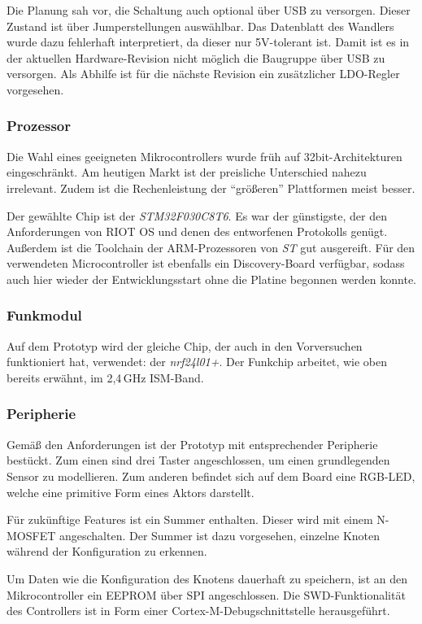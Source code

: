 \documentclass{IEEEtran}
\begin{document}
Die Planung sah vor, die Schaltung auch optional über USB zu versorgen.
Dieser Zustand ist über Jumperstellungen auswählbar.
Das Datenblatt des Wandlers wurde dazu fehlerhaft interpretiert, da dieser nur 5V-tolerant ist.
Damit ist es in der aktuellen Hardware-Revision nicht möglich die Baugruppe über USB zu versorgen.
Als Abhilfe ist für die nächste Revision ein zusätzlicher LDO-Regler vorgesehen.

\subsubsection{Prozessor}
Die Wahl eines geeigneten Mikrocontrollers wurde früh auf 32bit-Architekturen eingeschränkt.
Am heutigen Markt ist der preisliche Unterschied nahezu irrelevant.
Zudem ist die Rechenleistung der \enquote{größeren} Plattformen meist besser.

Der gewählte Chip ist der \emph{STM32F030C8T6}.
Es war der günstigste, der den Anforderungen von RIOT OS und denen des entworfenen Protokolls genügt.
Außerdem ist die Toolchain der ARM-Prozessoren von \emph{ST} gut ausgereift.
Für den verwendeten Microcontroller ist ebenfalls ein Discovery-Board verfügbar, sodass auch hier wieder der Entwicklungsstart ohne die Platine begonnen werden konnte.

\subsubsection{Funkmodul}
Auf dem Prototyp wird der gleiche Chip, der auch in den Vorversuchen funktioniert hat, verwendet: der \emph{nrf24l01+}. Der Funkchip arbeitet, wie oben bereits erwähnt, im 2,4\,GHz ISM-Band.


\subsubsection{Peripherie}
Gemäß den Anforderungen ist der Prototyp mit entsprechender Peripherie bestückt.
Zum einen sind drei Taster angeschlossen, um einen grundlegenden Sensor zu modellieren.
Zum anderen befindet sich auf dem Board eine RGB-LED, welche eine primitive Form eines Aktors darstellt.

Für zukünftige Features ist ein Summer enthalten.
Dieser wird mit einem N-MOSFET angeschalten.
Der Summer ist dazu vorgesehen, einzelne Knoten während der Konfiguration zu erkennen.

Um Daten wie die Konfiguration des Knotens dauerhaft zu speichern, ist an den Mikrocontroller ein EEPROM über SPI angeschlossen.
Die SWD-Funktionalität des Controllers ist in Form einer Cortex-M-Debugschnittstelle herausgeführt.
\end{document}
